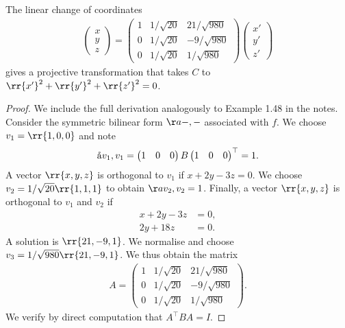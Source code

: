\documentclass{article}
\begin{document}
\begin{claim*}[2]
  The linear change of coordinates
  \begin{align*}
    \begin{pmatrix}
      x \\ y \\ z
    \end{pmatrix}
    =
    \begin{pmatrix}
      1 & 1/\sqrt{20} & 21/\sqrt{980}\\
      0 & 1/\sqrt{20} & -9/\sqrt{980}\\
      0 & 1/\sqrt{20} & 1/\sqrt{980}
    \end{pmatrix}
    \begin{pmatrix}
      x' \\ y' \\ z'
    \end{pmatrix}
  \end{align*}
  gives a projective transformation that takes $C$ to $\rr{x'}^2+\rr{y'}^2+\rr{z'}^2=0$.
  \begin{proof}
    We include the full derivation analogously to Example 1.48 in the notes.
    Consider the symmetric bilinear form $\aa{-,-}$ associated with $f$.
    We choose $v_1=\rr{1,0,0}$ and note
    \begin{align*}
      \aa{v_1,v_1}=\begin{pmatrix}
        1 & 0 & 0
        \end{pmatrix}B\begin{pmatrix}
        1 & 0 & 0
      \end{pmatrix}^\top = 1.
    \end{align*}
    A vector $\rr{x,y,z}$ is orthogonal to $v_1$ if $x+2y-3z=0$.
    We choose $v_2=1/\sqrt{20}\rr{1,1,1}$ to obtain $\aa{v_2,v_2}=1$.
    Finally, a vector $\rr{x,y,z}$ is orthogonal to $v_1$ and $v_2$ if
    \begin{align*}
      x+2y-3z  &= 0,\\
      2y+18z &= 0.
    \end{align*}
    A solution is $\rr{21,-9,1}$. We normalise and choose $v_3=1/\sqrt{980}\rr{21,-9,1}$.
    We thus obtain the matrix
    \begin{align*}
      A=
      \begin{pmatrix}
        1 & 1/\sqrt{20} & 21/\sqrt{980}\\
        0 & 1/\sqrt{20} & -9/\sqrt{980}\\
        0 & 1/\sqrt{20} & 1/\sqrt{980}
      \end{pmatrix}.
    \end{align*}
  We verify by direct computation that $A^\top BA = I$.   \end{proof}
\end{claim*}
\end{document}
